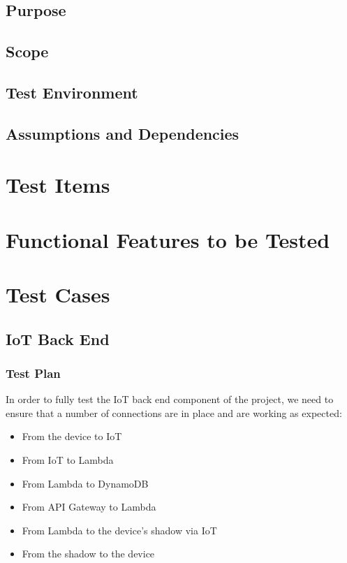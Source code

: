 \documentclass{article}
\begin{document}
	\subsection{Purpose}
	
	\subsection{Scope}
	
	\subsection{Test Environment}
	
	\subsection{Assumptions and Dependencies}

\section{Test Items}

\section{Functional Features to be Tested}

\section{Test Cases}

	\subsection{IoT Back End}
		\subsubsection{Test Plan}
			In order to fully test the IoT back end component of the project, we need to ensure that a number of connections are in place and are working as expected:
			\begin{itemize}
				\item{From the device to IoT}
				\item{From IoT to Lambda}
				\item{From Lambda to DynamoDB}
				\\
				\item{From API Gateway to Lambda}
				\item{From Lambda to the device's shadow via IoT}
				\item{From the shadow to the device}
			\end{itemize}
			
\end{document}
